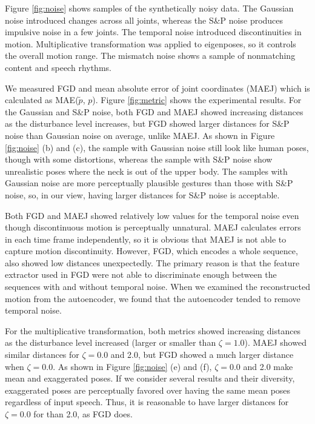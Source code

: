 \documentclass[acmtog]{acmart}
\begin{document}
Figure \ref{fig:noise} shows samples of the synthetically noisy data. The Gaussian noise introduced changes across all joints, whereas the S\&P noise produces impulsive noise in a few joints. The temporal noise introduced discontinuities in motion. Multiplicative transformation was applied to eigenposes, so it controls the overall motion range. The mismatch noise shows a sample of nonmatching content and speech rhythms.

We measured FGD and mean absolute error of joint coordinates (MAEJ) which is calculated as MAE($\tilde{p}$, $p$). Figure \ref{fig:metric} shows the experimental results. For the Gaussian and S\&P noise, both FGD and MAEJ showed increasing distances as the disturbance level increases, but FGD showed larger distances for S\&P noise than Gaussian noise on average, unlike MAEJ. As shown in Figure \ref{fig:noise} (b) and (c), the sample with Gaussian noise still look like human poses, though with some distortions, whereas the sample with S\&P noise show unrealistic poses where the neck is out of the upper body. The samples with Gaussian noise are more perceptually plausible gestures than those with S\&P noise, so, in our view, having larger distances for S\&P noise is acceptable.

Both FGD and MAEJ showed relatively low values for the temporal noise even though discontinuous motion is perceptually unnatural. MAEJ calculates errors in each time frame independently, so it is obvious that MAEJ is not able to capture motion discontinuity. However, FGD, which encodes a whole sequence, also showed low distances unexpectedly. The primary reason is that the feature extractor used in FGD were not able to discriminate enough between the sequences with and without temporal noise. When we examined the reconstructed motion from the autoencoder, we found that the autoencoder tended to remove temporal noise.

For the multiplicative transformation, both metrics showed increasing distances as the disturbance level increased (larger or smaller than $\zeta=1.0$). MAEJ showed similar distances for $\zeta=0.0$ and 2.0, but FGD showed a much larger distance when $\zeta=0.0$. As shown in Figure \ref{fig:noise} (e) and (f), $\zeta=0.0$ and 2.0 make mean and exaggerated poses. If we consider several results and their diversity, exaggerated poses are perceptually favored over having the same mean poses regardless of input speech. Thus, it is reasonable to have larger distances for $\zeta=0.0$ for than 2.0, as FGD does.
\end{document}
